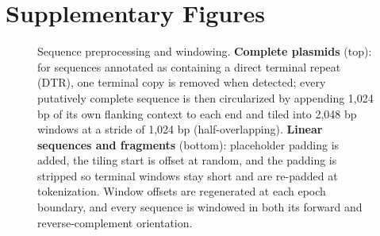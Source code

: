 %
%
%
%

\section*{Supplementary Figures}



\begin{figure}[h]
    \centering
\caption{
Sequence preprocessing and windowing. \textbf{Complete plasmids} (top): for sequences annotated as containing a direct terminal repeat (DTR), one terminal copy is removed when detected; every putatively complete sequence is then circularized by appending 1,024 bp of its own flanking context to each end and tiled into 2,048 bp windows at a stride of 1,024 bp (half-overlapping). \textbf{Linear sequences and fragments} (bottom): placeholder padding is added, the tiling start is offset at random, and the padding is stripped so terminal windows stay short and are re-padded at tokenization. Window offsets are regenerated at each epoch boundary, and every sequence is windowed in both its forward and reverse-complement orientation.
}
\label{fig:supp-windowing}
\end{figure}


\clearpage


